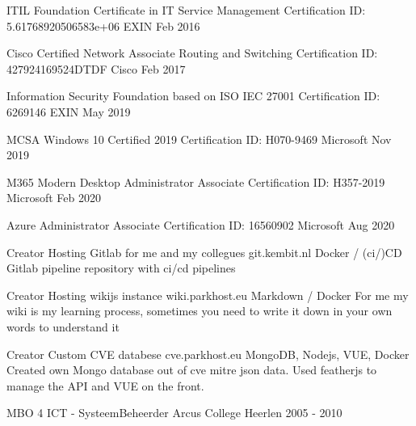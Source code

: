 \documentclass[11pt, letterpaper]{awesome-cv}
\begin{document}
\begin{cvhonors}

  \cvhonor
    {ITIL Foundation Certificate in IT Service Management}
    {Certification ID: 5.61768920506583e+06}
    {EXIN}
    {Feb 2016}

  \cvhonor
    {Cisco Certified Network Associate Routing and Switching}
    {Certification ID: 427924169524DTDF}
    {Cisco}
    {Feb 2017}

  \cvhonor
    {Information Security Foundation based on ISO IEC 27001}
    {Certification ID: 6269146}
    {EXIN}
    {May 2019}

  \cvhonor
    {MCSA Windows 10 Certified 2019}
    {Certification ID: H070-9469}
    {Microsoft}
    {Nov 2019}

  \cvhonor
    {M365 Modern Desktop Administrator Associate}
    {Certification ID: H357-2019}
    {Microsoft}
    {Feb 2020}

  \cvhonor
    {Azure Administrator Associate}
    {Certification ID: 16560902}
    {Microsoft}
    {Aug 2020}


\end{cvhonors}

\begin{cventries}

  \cventry
    {Creator}
    {Hosting Gitlab for me and my collegues}
    {git.kembit.nl}
    {Docker / (ci/)CD Gitlab pipeline}
    {repository with ci/cd pipelines}

  \cventry
    {Creator}
    {Hosting wikijs instance}
    {wiki.parkhost.eu}
    {Markdown / Docker}
    {For me my wiki is my learning process, sometimes you need to write it down in your own words to understand it}

  \cventry
    {Creator}
    {Custom CVE databese}
    {cve.parkhost.eu}
    {MongoDB, Nodejs, VUE, Docker}
    {Created own Mongo database out of cve mitre json data. Used featherjs to manage the API and VUE on the front.}


\end{cventries}

\begin{cventries}

  \cventry
    {MBO 4 ICT - SysteemBeheerder}
    {Arcus College}
    {Heerlen}
    {2005 - 2010}
    {
    }


\end{cventries}

\end{document}

